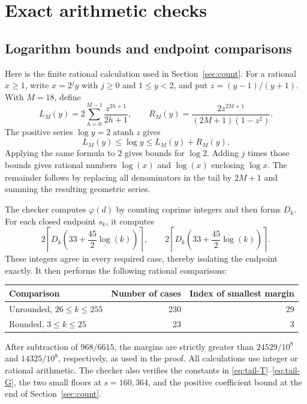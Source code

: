 \section{Exact arithmetic checks}\label{app:checks}

\subsection{Logarithm bounds and endpoint comparisons}
\label{app:endpoint-checks}

Here is the finite rational calculation used in
Section~\ref{sec:count}. For a rational $x\ge1$, write
$x=2^j y$ with $j\ge0$ and $1\le y<2$, and put
$z=(y-1)/(y+1)$. With $M=18$, define
\[
 L_M(y)=2\sum_{h=0}^{M-1}\frac{z^{2h+1}}{2h+1},\qquad
 R_M(y)=\frac{2z^{2M+1}}{(2M+1)(1-z^2)}.
\]
The positive series $\log y=2\operatorname{atanh}z$ gives
\[
 L_M(y)\le\log y\le L_M(y)+R_M(y).
\]
Applying the same formula to $2$ gives bounds for $\log2$.
Adding $j$ times those bounds gives rational numbers
$\underline{\log}(x)$ and $\overline{\log}(x)$ enclosing
$\log x$. The remainder follows by replacing all denominators
in the tail by $2M+1$ and summing the resulting geometric series.

The checker computes $\varphi(d)$ by counting coprime integers and
then forms $D_k$. For each closed endpoint $s_k$, it computes
\[
 2\left\lceil D_k\left(33+\frac{45}{2}
                     \underline{\log}(k)\right)\right\rceil,
 \qquad
 2\left\lceil D_k\left(33+\frac{45}{2}
                     \overline{\log}(k)\right)\right\rceil.
\]
These integers agree in every required case, thereby isolating the
endpoint exactly. It then performs the following rational comparisons:
\begin{center}
\begin{tabular}{@{}lrr@{}}
\toprule
Comparison&Number of cases&Index of smallest margin\\
\midrule
Unrounded, $26\le k\le255$&230&29\\
Rounded, $3\le k\le25$&23&3\\
\bottomrule
\end{tabular}
\end{center}
After subtraction of $968/6615$, the margins are strictly greater
than $24529/10^8$ and $14325/10^8$, respectively, as used in the
proof. All calculations use integer or rational arithmetic. The
checker also verifies the constants in
\eqref{eq:tail-T}--\eqref{eq:tail-G}, the two small floors at
$s=160,364$, and the positive coefficient bound at the end of
Section~\ref{sec:count}.

